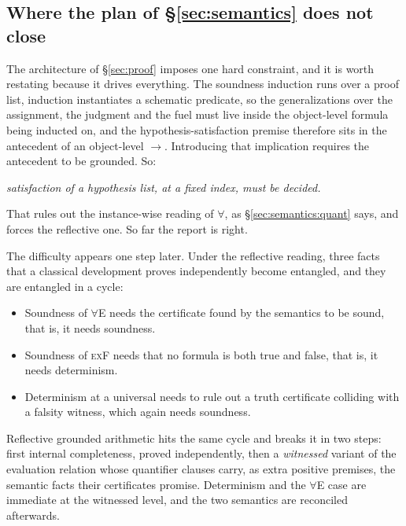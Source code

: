 \subsection{Where the plan of \S\ref{sec:semantics} does not close}

The architecture of \S\ref{sec:proof} imposes one hard constraint, and it is
worth restating because it drives everything.  The soundness induction runs over
a proof list, \QGA{} induction instantiates a schematic predicate, so the
generalizations over the assignment, the judgment and the fuel must live inside
the object-level formula being inducted on, and the hypothesis-satisfaction
premise therefore sits in the antecedent of an object-level $\longrightarrow$.
Introducing that implication requires the antecedent to be grounded.  So:

\begin{center}
\emph{satisfaction of a hypothesis list, at a fixed index, must be decided.}
\end{center}

\noindent
That rules out the instance-wise reading of $\forall$, as \S\ref{sec:semantics:quant}
says, and forces the reflective one.  So far the report is right.

The difficulty appears one step later.  Under the reflective reading, three
facts that a classical development proves independently become entangled, and
they are entangled in a cycle:

\begin{itemize}
\item Soundness of $\forall$E needs the certificate found by the semantics to be
      sound, that is, it needs soundness.
\item Soundness of \textsc{exF} needs that no formula is both true and false,
      that is, it needs determinism.
\item Determinism at a universal needs to rule out a truth certificate colliding
      with a falsity witness, which again needs soundness.
\end{itemize}

\noindent
Reflective grounded arithmetic hits the same cycle and breaks it in two steps:
first internal completeness, proved independently, then a \emph{witnessed}
variant of the evaluation relation whose quantifier clauses carry, as extra
positive premises, the semantic facts their certificates promise.  Determinism
and the $\forall$E case are immediate at the witnessed level, and the two
semantics are reconciled afterwards.

